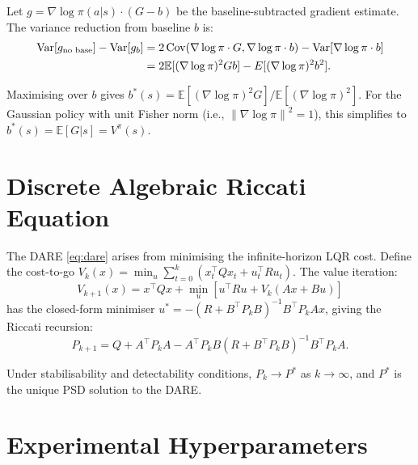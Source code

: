 \documentclass[11pt, a4paper]{article}
\newcommand{\E}{\mathbb{E}}
\newcommand{\T}{\top}
\newcommand{\grad}{\nabla}
\newcommand{\norm}[1]{\left\lVert #1 \right\rVert}
\begin{document}
Let $g = \grad \log \pi(a|s) \cdot (G - b)$ be the baseline-subtracted gradient estimate.
The variance reduction from baseline $b$ is:
\begin{align}
    \mathrm{Var}[g_{\text{no base}}] - \mathrm{Var}[g_b]
    &= 2 \, \mathrm{Cov}(\grad \log \pi \cdot G, \grad \log \pi \cdot b)
    - \mathrm{Var}[\grad \log \pi \cdot b] \notag\\
    &= 2 \E[(\grad \log \pi)^2 G b] - E[(\grad \log \pi)^2 b^2].
\end{align}

Maximising over $b$ gives $b^*(s) = \E[(\grad \log \pi)^2 G] / \E[(\grad \log \pi)^2]$.
For the Gaussian policy with unit Fisher norm (i.e., $\norm{\grad \log \pi}^2 = 1$),
this simplifies to $b^*(s) = \E[G | s] = V^\pi(s)$.

\section{Discrete Algebraic Riccati Equation}

The DARE \eqref{eq:dare} arises from minimising the infinite-horizon LQR cost.
Define the cost-to-go $V_k(x) = \min_u \sum_{t=0}^{k} (x_t^\T Q x_t + u_t^\T R u_t)$.
The value iteration:
\begin{equation}
    V_{k+1}(x) = x^\T Q x + \min_u [u^\T R u + V_k(Ax + Bu)]
\end{equation}
has the closed-form minimiser $u^* = -(R + B^\T P_k B)^{-1} B^\T P_k A x$,
giving the Riccati recursion:
\begin{equation}
    P_{k+1} = Q + A^\T P_k A - A^\T P_k B(R + B^\T P_k B)^{-1} B^\T P_k A.
\end{equation}

Under stabilisability and detectability conditions, $P_k \to P^*$ as $k \to \infty$,
and $P^*$ is the unique PSD solution to the DARE.

\section{Experimental Hyperparameters}
\end{document}
